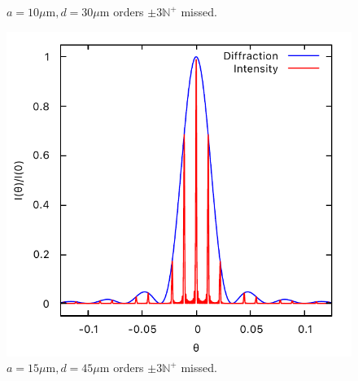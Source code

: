 \documentclass[11pt, twoside]{article}   	%
\theoremstyle{plain}
\theoremstyle{definition}
\begin{document}
\begin{description}
\begin{figure}[htbp]
\begin{minipage}[t]{0.33\linewidth}
		\caption{\centering $a = 10\mu\mathrm{m}, d = 30\mu\mathrm{m}$
			\newline orders $\pm 3\mathbb N^+$ missed.}
		\end{minipage}
		\begin{minipage}[t]{0.33\linewidth}
		\centering
		\includegraphics[width=0.9\linewidth]{15-45}
		\caption{\centering $a = 15\mu\mathrm{m}, d = 45\mu\mathrm{m}$
			\newline orders $\pm 3\mathbb N^+$ missed.}
		\end{minipage}
		\medskip


\end{figure}
\end{description}
\end{document}
